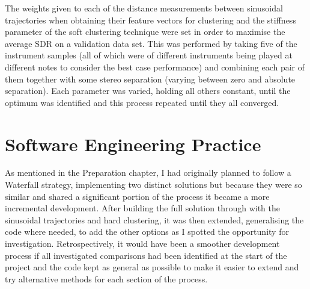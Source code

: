 \documentclass[12pt,a4paper,twoside,openright]{report}
\begin{document}

The weights given to each of the distance measurements between sinusoidal trajectories when obtaining their feature vectors for clustering and the stiffness parameter of the soft clustering technique were set in order to maximise the average SDR on a validation data set. This was performed by taking five of the instrument samples (all of which were of different instruments being played at different notes to consider the best case performance) and combining each pair of them together with some stereo separation (varying between zero and absolute separation). Each parameter was varied, holding all others constant, until the optimum was identified and this process repeated until they all converged. 






\section{Software Engineering Practice}

As mentioned in the Preparation chapter, I had originally planned to follow a Waterfall strategy, implementing two distinct solutions but because they were so similar and shared a significant portion of the process it became a more incremental development. After building the full solution through with the sinusoidal trajectories and hard clustering, it was then extended, generalising the code where needed, to add the other options as I spotted the opportunity for investigation. Retrospectively, it would have been a smoother development process if all investigated comparisons had been identified at the start of the project and the code kept as general as possible to make it easier to extend and try alternative methods for each section of the process.
\end{document}

